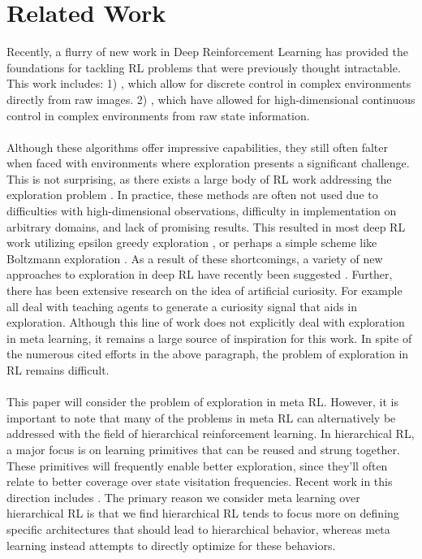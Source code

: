 \documentclass{article} %
\begin{document}
\section{Related Work} 
Recently, a flurry of new work in Deep Reinforcement Learning has provided the foundations for tackling RL problems that were previously thought intractable. This work includes: 1) \cite{dqn, a3c}, which allow for discrete control in complex environments directly from raw images. 2) \cite{trpo, a3c, ppo, ddpg}, which have allowed for high-dimensional continuous control in complex environments from raw state information. \\
\\
Although these algorithms offer impressive capabilities, they still often falter when faced with environments where exploration presents a significant challenge. This is not surprising, as there exists a large body of RL work addressing the exploration problem \citep{kearns, rmax, beb}. In practice, these methods are often not used due to difficulties with high-dimensional observations, difficulty in implementation on arbitrary domains, and lack of promising results. This resulted in most deep RL work utilizing epsilon greedy exploration \citep{dqn}, or perhaps a simple scheme like Boltzmann exploration \citep{boltzman}. As a result of these shortcomings, a variety of new approaches to exploration in deep RL have recently been suggested \citep{hash, vime, stadie, bootstrapdqn, countbased, countbased2}. Further, there has been extensive research on the idea of artificial curiosity. For example \cite{Ngo2012, Graziano2011, Schmidhuber1991, Schmidhuber2015, Storck1995, Sun2011} all deal with teaching agents to generate a curiosity signal that aids in exploration. Although this line of work does not explicitly deal with exploration in meta learning, it remains a large source of inspiration for this work. In spite of the numerous cited efforts in the above paragraph, the problem of exploration in RL remains difficult. \\
\\
This paper will consider the problem of exploration in meta RL. However, it is important to note that many of the problems in meta RL can alternatively be addressed with the field of hierarchical reinforcement learning. In hierarchical RL, a major focus is on learning primitives that can be reused and strung together. These primitives will frequently enable better exploration, since they'll often relate to better coverage over state visitation frequencies. Recent work in this direction includes \citep{feudal, optioncritic, minecraft, progressive}. The primary reason we consider meta learning over hierarchical RL is that we find hierarchical RL tends to focus more on defining specific architectures that should lead to hierarchical behavior, whereas meta learning instead attempts to directly optimize for these behaviors. 
\end{document}
